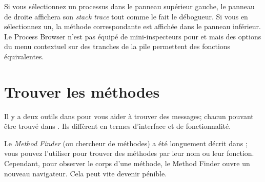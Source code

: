 \documentclass[a4paper,10pt,twoside]{book}
\begin{document}
Si vous s\'electionnez un processus dans le panneau sup\'erieur gauche, le panneau de droite
affichera son \emph{stack trace} tout comme le fait le d\'ebogueur.
Si vous en s\'electionnez un, la m\'ethode correspondante est affich\'ee dans le panneau
inf\'erieur.
Le Process Browser n'est pas \'equip\'e de mini-inspecteurs pour 
\self et  mais des options du menu contextuel sur des 
tranches de la pile permettent des fonctions \'equivalentes.



\section{Trouver les m\'ethodes}
\label{sec:methodFinder} 

Il y a deux outils dans \sq pour vous aider \`a trouver des messages; 
chacun pouvant \^etre trouv\'e dans \toolsflapind.
Ils diff\`erent en termes d'interface et de fonctionnalit\'e.

Le \emph{Method Finder} (ou chercheur de m\'ethodes) a \'et\'e longuement d\'ecrit
dans ; vous pouvez l'utiliser pour trouver des m\'ethodes
par leur nom ou leur fonction.
Cependant, pour observer le corps d'une m\'ethode, le Method Finder ouvre 
un nouveau navigateur. Cela peut vite devenir p\'enible.
\end{document}
